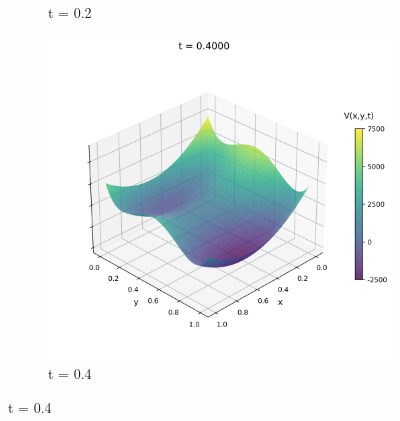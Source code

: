 \documentclass{article}
\theoremstyle{definition}
\theoremstyle{plain}
\theoremstyle{remark}
\begin{document}
\begin{figure}[h]
\begin{subfigure}[b]{0.3\textwidth}
    \caption{t = 0.2}
  \end{subfigure}
  \hfill
  \begin{subfigure}[b]{0.3\textwidth}
    \centering
    \includegraphics[width=\textwidth, trim=0cm 0cm 0cm 1cm, clip]{figures/potential_frame_0020.png}
    \caption{t = 0.4}
  \end{subfigure}
  
  \vspace{0.5cm}
  

\end{figure}
\end{document}
